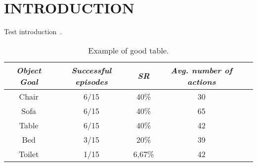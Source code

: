 \section{INTRODUCTION}

Test introduction~\cite{Sethian1996}.

\begin{table}[t]
    \centering
    \begin{tabular}{c|cccc}
        \toprule
        \textit{\textbf{Object Goal}} & \textit{\textbf{Successful episodes}} & \textit{\textbf{SR}} & \textit{\textbf{Avg. number of actions}} \\ \midrule
        Chair                         & 6/15                                  & 40\%                 & 30                                       \\
        Sofa                          & 6/15                                  & 40\%                 & 65                                       \\
        Table                         & 6/15                                  & 40\%                 & 42                                       \\
        Bed                           & 3/15                                  & 20\%                 & 39                                       \\
        Toilet                        & 1/15                                  & 6,67\%               & 42                                       \\ \bottomrule
    \end{tabular}
    \caption{Example of good table.}
    \label{tab:vlv}
\end{table}